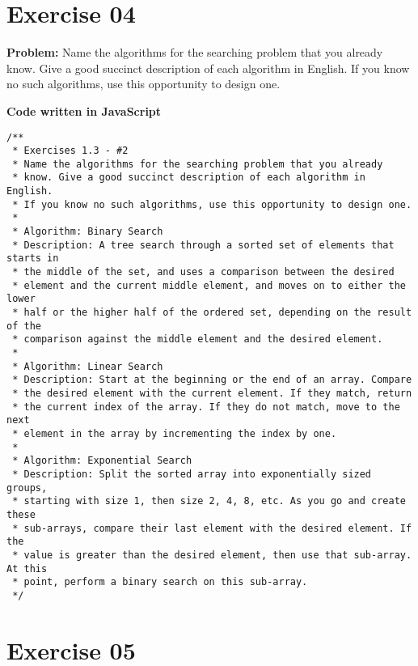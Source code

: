 \documentclass[paper=a4, fontsize=11pt]{scrartcl} %
\numberwithin{equation}{section} %
\numberwithin{figure}{section} %
\numberwithin{table}{section} %
\begin{document}

\section{Exercise 04}

\textbf{Problem:} Name the algorithms for the searching problem that you already know. Give a good succinct description of each algorithm in English. If you know no such algorithms, use this opportunity to design one.

\bigskip
\textbf{Code written in JavaScript}
\begin{lstlisting}
/**
 * Exercises 1.3 - #2
 * Name the algorithms for the searching problem that you already
 * know. Give a good succinct description of each algorithm in English.
 * If you know no such algorithms, use this opportunity to design one.
 * 
 * Algorithm: Binary Search
 * Description: A tree search through a sorted set of elements that starts in
 * the middle of the set, and uses a comparison between the desired 
 * element and the current middle element, and moves on to either the lower
 * half or the higher half of the ordered set, depending on the result of the 
 * comparison against the middle element and the desired element.
 * 
 * Algorithm: Linear Search
 * Description: Start at the beginning or the end of an array. Compare
 * the desired element with the current element. If they match, return 
 * the current index of the array. If they do not match, move to the next
 * element in the array by incrementing the index by one.
 * 
 * Algorithm: Exponential Search
 * Description: Split the sorted array into exponentially sized groups,
 * starting with size 1, then size 2, 4, 8, etc. As you go and create these 
 * sub-arrays, compare their last element with the desired element. If the 
 * value is greater than the desired element, then use that sub-array. At this
 * point, perform a binary search on this sub-array.
 */
\end{lstlisting}


\section{Exercise 05}
\end{document}
